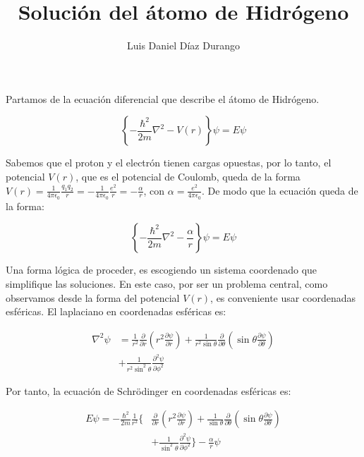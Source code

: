 \documentclass[twocolumn]{article}
\title{Solución del átomo de Hidrógeno}
\author{Luis Daniel Díaz Durango}
\begin{document}
\maketitle

Partamos de la ecuación diferencial que describe el átomo de Hidrógeno.

\begin{equation}
    \label{eq:Schrodinger}
    \left\{- \frac{\hbar^2}{2m} \nabla^2  - V(r)\right\} \psi = E \psi
\end{equation}

Sabemos que el proton y el electrón tienen cargas opuestas, por lo tanto, el potencial $V(r)$, que es el potencial de Coulomb, queda de la forma $V(r) = \frac{1}{4\pi \epsilon_0} \frac{q_1 q_2}{r} =- \frac{1}{4\pi \epsilon_0} \frac{e^2}{r} = -\frac{\alpha}{r}$, con $\alpha = \frac{e^2}{4\pi \epsilon_0}$. De modo que la ecuación queda de la forma:

\begin{equation}
    \label{eq:Schrodinger2}
    \left\{- \frac{\hbar^2}{2m} \nabla^2  - \frac{\alpha}{r}\right\} \psi = E \psi
\end{equation}

Una forma lógica de proceder, es escogiendo un sistema coordenado que simplifique las soluciones. En este caso, por ser un problema central, como observamos desde la forma del potencial $V(r)$, es conveniente usar coordenadas esféricas. El laplaciano en coordenadas esféricas es:

\begin{align*}
    \label{eq:Laplaciano}
    \nabla^2 \psi &= \frac{1}{r^2} \frac{\partial}{\partial r} \left(r^2 \frac{\partial \psi}{\partial r}\right) + \frac{1}{r^2 \sin \theta} \frac{\partial}{\partial \theta} \left(\sin \theta \frac{\partial \psi}{\partial \theta}\right) \\
    &+ \frac{1}{r^2 \sin^2 \theta} \frac{\partial^2 \psi}{\partial \phi^2}
\end{align*}

Por tanto, la ecuación de Schrödinger en coordenadas esféricas es:

\begin{align*}
    E\psi = 
    -\frac{\hbar^2}{2m} \frac{1}{r^2}
    \bigg\{
    & \frac{\partial}{\partial r} \left(r^2 \frac{\partial \psi}{\partial r}\right) 
    + \frac{1}{\sin \theta} \frac{\partial}{\partial \theta} \left(\sin \theta \frac{\partial \psi}{\partial \theta}\right) \\ 
    &+ \frac{1}{\sin^2 \theta} \frac{\partial^2 \psi}{\partial \phi^2}\bigg\} - \frac{\alpha}{r}\psi
\end{align*}
\end{document}
